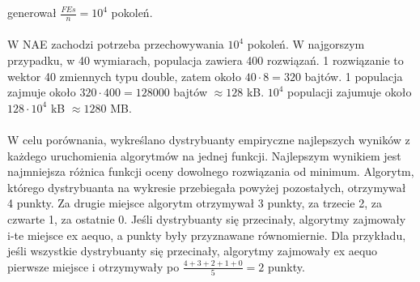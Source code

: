 \documentclass[12pt, a4paper]{article}
\begin{document}
generował $\frac{FEs}{n} = 10^4$ pokoleń. \\
\\
W NAE zachodzi potrzeba przechowywania $10^4$ pokoleń. W najgorszym przypadku, w 40 wymiarach, populacja zawiera 400 rozwiązań.
1 rozwiązanie to wektor 40 zmiennych typu double, zatem około $40\cdot8=320$ bajtów. 
1 populacja zajmuje około $320\cdot400 = 128000$ bajtów $\approx 128$ kB. 
$10^4$ populacji zajumuje około $128 \cdot 10^4$ kB $\approx 1280$ MB. \\
\\
W celu porównania, wykreślano dystrybuanty empiryczne najlepszych wyników z każdego uruchomienia 
algorytmów na jednej funkcji. Najlepszym wynikiem jest najmniejsza różnica funkcji oceny dowolnego rozwiązania od minimum.
Algorytm, którego dystrybuanta na wykresie przebiegała powyżej pozostałych, otrzymywał 4 punkty. 
Za drugie miejsce algorytm otrzymywał 3 punkty, za trzecie 2, za czwarte 1, za ostatnie 0. 
Jeśli dystrybuanty się przecinały, algorytmy zajmowały i-te miejsce ex aequo, a punkty były przyznawane równomiernie.
Dla przykładu, jeśli wszystkie dystrybuanty się przecinały, algorytmy zajmowały ex aequo pierwsze miejsce i otrzymywały po
$\frac{4+3+2+1+0}{5}=2$ punkty.

\nocite{*}


\end{document}
